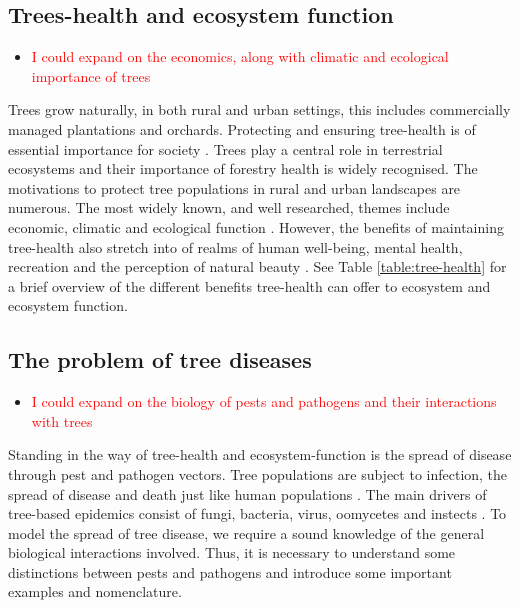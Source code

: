 \subsection{Trees-health and ecosystem function}
\begin{itemize}
    \item \textcolor{red}{I could expand on the economics, along with climatic and ecological importance of trees}
\end{itemize}
Trees grow naturally, in both rural and urban settings, this includes commercially managed plantations and orchards. Protecting and ensuring tree-health is of essential importance for society \cite{Boyd1235773}. Trees play a central role in terrestrial ecosystems \cite{boyd2013consequence} and their importance of forestry health is widely recognised. The motivations to protect tree populations in rural and urban landscapes are numerous. The most widely known, and well researched, themes include economic, climatic and ecological function \cite{freer2017tree}. However, the benefits of maintaining tree-health also stretch into of realms of human well-being, mental health, recreation and the perception of natural beauty \cite{tyrvainen2005benefits}. See Table \ref{table:tree-health} for a brief overview of the different benefits tree-health can offer to ecosystem and ecosystem function.\\

\subsection{The problem of tree diseases}
\begin{itemize}
    \item \textcolor{red}{I could expand on the biology of pests and pathogens and their interactions with trees}
\end{itemize}
Standing in the way of tree-health and ecosystem-function is the spread of disease through pest and pathogen vectors. Tree populations are subject to infection, the spread of disease and death just like human populations \cite{hethcote2000mathematics}. The main drivers of tree-based epidemics consist of fungi, bacteria, virus, oomycetes and instects \cite{manion1981tree}. To model the spread of tree disease, we require a sound knowledge of the general biological interactions involved. Thus, it is necessary to understand some distinctions between pests and pathogens and introduce some important examples and nomenclature.\\

